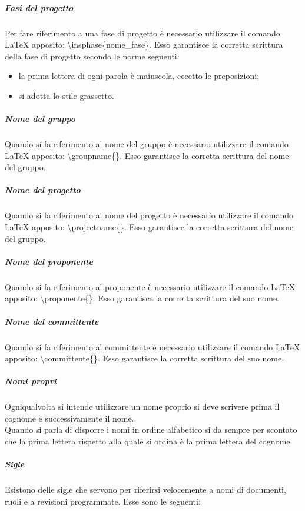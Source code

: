 				\subparagraph{Fasi del progetto}
					Per fare riferimento a una fase di progetto è necessario utilizzare il comando \LaTeX{} apposito: \textbackslash insphase\{nome\_fase\}. Esso garantisce la corretta scrittura della fase di progetto secondo le norme seguenti:
					\begin{itemize}
						\item la prima lettera di ogni parola è maiuscola, eccetto le preposizioni;
						\item si adotta lo stile grassetto.
					\end{itemize}
				\subparagraph{Nome del gruppo}
					Quando si fa riferimento al nome del gruppo è necessario utilizzare il comando \LaTeX{} apposito: \textbackslash groupname\{\}. Esso garantisce la corretta scrittura del nome del gruppo.
				\subparagraph{Nome del progetto}
					Quando si fa riferimento al nome del progetto è necessario utilizzare il comando \LaTeX{} apposito: \textbackslash projectname\{\}. Esso garantisce la corretta scrittura del nome del gruppo.
				\subparagraph{Nome del proponente}
					Quando si fa riferimento al proponente è necessario utilizzare il comando \LaTeX{} apposito: \textbackslash proponente\{\}. Esso garantisce la corretta scrittura del suo nome.
				\subparagraph{Nome del committente}
					Quando si fa riferimento al committente è necessario utilizzare il comando \LaTeX{} apposito: \textbackslash committente\{\}. Esso garantisce la corretta scrittura del suo nome.
				\subparagraph{Nomi propri}
					Ogniqualvolta si intende utilizzare un nome proprio si deve scrivere prima il cognome e successivamente il nome.\\
					Quando si parla di disporre i nomi in ordine alfabetico si da sempre per scontato che la prima lettera rispetto alla quale si ordina è la prima lettera del cognome.
				\subparagraph{Sigle}
					Esistono delle sigle che servono per riferirsi velocemente a nomi di documenti, ruoli e a revisioni programmate. Esse sono le seguenti:
